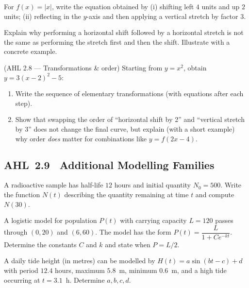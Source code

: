 \documentclass[11pt]{article}
\def\textbf#1{#1}%
\newcommand{\tocsubsection}[1]{\subsection{#1}}
\newcounter{question}
\begin{document}
\begin{question}
For $f(x)=|x|$, write the equation obtained by (i) shifting left $4$ units and
up $2$ units; (ii) reflecting in the $y$-axis and then applying a vertical
stretch by factor $3$.
\end{question}

\begin{question}
Explain why performing a horizontal shift followed by a horizontal stretch is
not the same as performing the stretch first and then the shift.  Illustrate
with a concrete example.
\end{question}

\begin{question}
\textbf{(AHL 2.8 — Transformations \& order)} Starting from $y=x^2$, obtain $y=3(x-2)^2-5$:
\begin{enumerate}
  \item Write the sequence of elementary transformations (with equations after each step).
  \item Show that swapping the order of “horizontal shift by 2” and “vertical stretch by 3” does not change the final curve, but explain (with a short example) why order \emph{does} matter for combinations like $y=f(2x-4)$.
\end{enumerate}
\end{question}





\tocsubsection{AHL 2.9 \; Additional Modelling Families}

\begin{question}
A radioactive sample has half-life $12$ hours and initial quantity $N_0=500$.
Write the function $N(t)$ describing the quantity remaining at time $t$ and
compute $N(30)$.
\end{question}

\begin{question}
A logistic model for population $P(t)$ with carrying capacity $L=120$ passes
through $(0,20)$ and $(6,60)$.  The model has the form $P(t)=\dfrac{L}{1+Ce^{-kt}}$.
Determine the constants $C$ and $k$ and state when $P=L/2$.
\end{question}

\begin{question}
A daily tide height (in metres) can be modelled by $H(t)=a\sin(bt-c)+d$ with
period $12.4$ hours, maximum $5.8$ m, minimum $0.6$ m, and a high tide
occurring at $t=3.1$ h.  Determine $a,b,c,d$.
\end{question}
\end{document}
